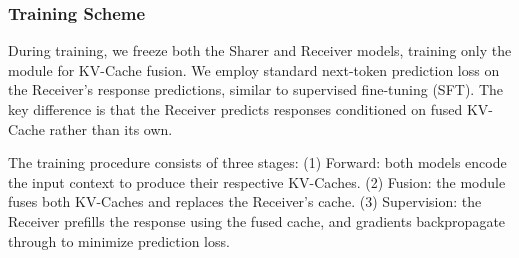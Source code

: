 \subsubsection{Training Scheme}

During training, we freeze both the Sharer and Receiver models, training only the \name module for KV-Cache fusion. 
We employ standard next-token prediction loss on the Receiver's response predictions, similar to supervised fine-tuning (SFT). 
The key difference is that the Receiver predicts responses conditioned on fused KV-Cache rather than its own.

The training procedure consists of three stages: 
(1) Forward: both models encode the input context to produce their respective KV-Caches.
(2) Fusion: the \name module fuses both KV-Caches and replaces the Receiver's cache.
(3) Supervision: the Receiver prefills the response using the fused cache, and gradients backpropagate through \name to minimize prediction loss.


